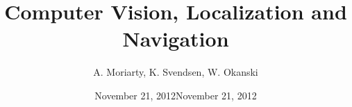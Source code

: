 \documentclass[11pt, oneside]{amsart}   	%
\title{Computer Vision, Localization and Navigation}
\author{A. Moriarty, K. Svendsen,  W. Okanski}
\date{November 21, 2012}							%
\begin{document}
\maketitle

\clearpage

\clearpage

\date{November 21, 2012}	
\end{document}
